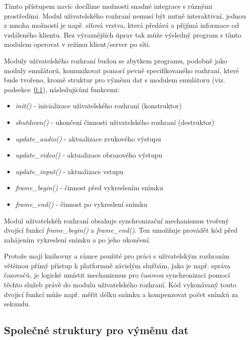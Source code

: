Tímto přístupem navíc docílíme možnosti snadné integrace s různými prostředími.
Modul uživatelského rozhraní nemusí být nutně interaktivní, jednou z mnoha
možností je např. síťová vrstva, která předává a přijímá informace od
vzdáleného klientu. Bez výraznějších úprav tak může výsledný program s tímto
modulem operovat v režimu klient/server po síti.

Moduly uživatelského rozhraní budou se zbytkem programu, podobně jako moduly
emulátorů, komunikovat pomocí pevně specifikovaného rozhraní, které bude
tvořeno, kromě struktur pro výměnu dat s modulem emulátoru (viz.
podsekce~\ref{chap:anal_architecture_struct}), následujícími funkcemi:

\begin{itemize}
\item {\it init()} - inicializace uživatelského rozhraní (konstruktor)
\item {\it shutdown()} - ukončení činnosti uživatelského rozhraní (destruktor)
\item {\it update\_audio()} - aktualizace zvukového výstupu
\item {\it update\_video()} - aktualizace obrazového výstupu
\item {\it update\_input()} - aktualizace vstupu
\item {\it frame\_begin()} - činnost před vykreslením snímku
\item {\it frame\_end()} - činnost po vykreslení snímku
\end{itemize}

Modul uživatelskéh rozhraní obsahuje synchronizační mechanismus tvořený dvojicí
funkcí {\it frame\_begin()} a {\it frame\_end()}. Ten umožňuje provádět kód
před zahájením vykreslení snímku a po jeho ukončení.

Protože mají knihovny a rámce použité pro práci s uživatelským rozhraním
většinou přímý přístup k platformně závislým službám, jako je např. správa
časovačů, je logické umístit mechanismus pro časovou synchronizaci pomocí
těchto služeb právě do modulu uživatelského rozhraní. Kód vykonávaný touto
dvojicí funkcí může např. měřit délku snímku a kompenzovat počet snímků za
sekundu.

%
%

\subsection{Společné struktury pro výměnu
dat}\label{chap:anal_architecture_struct}


